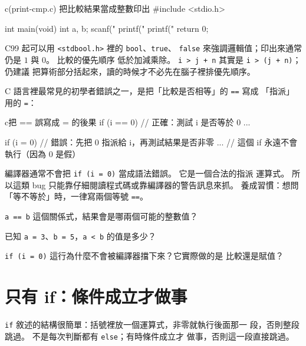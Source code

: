 \begin{example}{c}{(print-cmp.c) 把比較結果當成整數印出}
#include <stdio.h>

int main(void) {
    int a, b;
    scanf("%
    printf("%
    printf("%
    return 0;
}
\end{example}


C99 起可以用 \texttt{<stdbool.h>} 裡的 \texttt{bool}、\texttt{true}、
\texttt{false} 來強調邏輯值；印出來通常仍是 $1$ 與 $0$。 比較的優先順序
低於加減乘除。 \texttt{i > j + n} 其實是 \texttt{i > (j + n)}；仍建議
把算術部分括起來，讀的時候才不必先在腦子裡排優先順序。

C 語言裡最常見的初學者錯誤之一，是把「比較是否相等」的 \texttt{==} 寫成
「指派」用的 \texttt{=}：

\begin{code}{c}{把 == 誤寫成 = 的後果}
if (i == 0) {      // 正確：測試 i 是否等於 0
    ...
}

if (i = 0) {       // 錯誤：先把 0 指派給 i，再測試結果是否非零
    ...            // 這個 if 永遠不會執行（因為 0 是假）
}
\end{code}

編譯器通常不會把 \texttt{if (i = 0)} 當成語法錯誤。 它是一個合法的指派
運算式。 所以這類 bug 只能靠仔細閱讀程式碼或靠編譯器的警告訊息來抓。
養成習慣：想問「等不等於」時，一律寫兩個等號 \texttt{==}。


\begin{drills}[label=drills:cond-relational]
\item \texttt{a == b} 這個關係式，結果會是哪兩個可能的整數值？
\item 已知 \texttt{a = 3}、\texttt{b = 5}，\texttt{a < b} 的值是多少？
\item \texttt{if (i = 0)} 這行為什麼不會被編譯器擋下來？它實際做的是
比較還是賦值？
\end{drills}

\section{只有 if：條件成立才做事}
\label{sec:cond-if-only}

\texttt{if} 敘述的結構很簡單：括號裡放一個運算式，非零就執行後面那一
段，否則整段跳過。 不是每次判斷都有 \texttt{else}；有時條件成立才
做事，否則這一段直接跳過。

